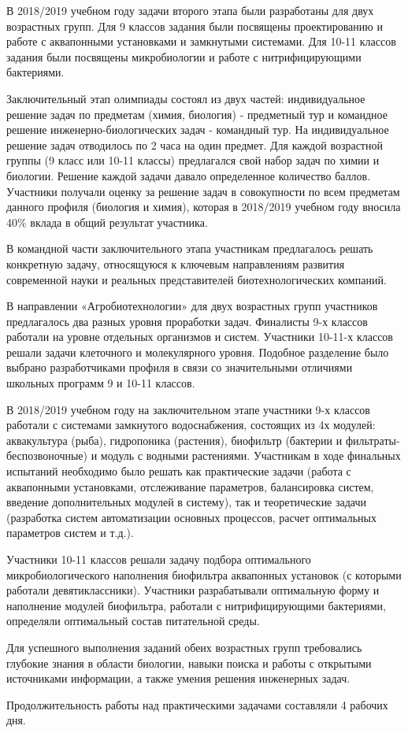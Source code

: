 В 2018/2019 учебном году задачи второго этапа были разработаны для двух возрастных групп. Для 9 классов задания были посвящены проектированию и работе с аквапонными установками и замкнутыми системами. Для 10-11 классов задания были посвящены микробиологии и работе с нитрифицирующими бактериями. 

Заключительный этап олимпиады состоял из двух частей: индивидуальное решение задач по предметам (химия, биология) - предметный тур и командное решение инженерно-биологических задач - командный тур. На индивидуальное решение задач отводилось по 2 часа на один предмет. Для каждой возрастной группы (9 класс или 10-11 классы) предлагался свой набор задач по химии и биологии. Решение каждой задачи давало определенное количество баллов. Участники получали оценку за решение задач в совокупности по всем предметам данного профиля (биология и химия), которая в 2018/2019 учебном году вносила 40\% вклада в общий результат участника.

В командной части заключительного этапа участникам предлагалось  решать конкретную задачу, относящуюся к ключевым направлениям развития современной науки и реальных представителей биотехнологических компаний. 

В направлении «Агробиотехнологии» для двух возрастных групп участников предлагалось два разных уровня проработки задач. Финалисты 9-х классов работали на уровне отдельных организмов и систем. Участники 10-11-х классов решали задачи клеточного и молекулярного уровня. Подобное разделение было выбрано разработчиками профиля в связи со значительными отличиями школьных программ 9 и 10-11 классов. 

В 2018/2019 учебном году на заключительном этапе участники 9-х классов работали с системами замкнутого водоснабжения, состоящих из 4х модулей: аквакультура (рыба), гидропоника (растения), биофильтр (бактерии и фильтраты-беспозвоночные) и модуль с водными растениями. Участникам в ходе финальных испытаний необходимо было решать как практические задачи (работа с аквапонными установками, отслеживание параметров, балансировка систем, введение дополнительных модулей в систему), так и теоретические задачи (разработка систем автоматизации основных процессов, расчет оптимальных параметров систем и т.д.). 

Участники 10-11 классов решали задачу подбора оптимального микробиологического наполнения биофильтра аквапонных установок (с которыми работали девятиклассники). Участники разрабатывали оптимальную форму и наполнение модулей биофильтра, работали с нитрифицирующими бактериями, определяли оптимальный состав питательной среды.

Для успешного выполнения заданий обеих возрастных групп требовались глубокие знания в области биологии, навыки поиска и работы с открытыми источниками информации, а также умения решения инженерных задач.

Продолжительность работы над практическими задачами  составляли 4 рабочих дня. 



\clearpage
\endgroup